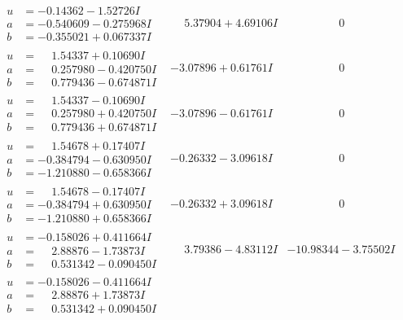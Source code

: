\documentclass[1p]{elsarticle_modified}
\theoremstyle{definition}
\begin{document}
$$\begin{array}{c|c|c}
\begin{aligned}
u &= -0.14362 - 1.52726 I \\
a &= -0.540609 - 0.275968 I \\
b &= -0.355021 + 0.067337 I\end{aligned}
 & \phantom{-}5.37904 + 4.69106 I & \phantom{-0.000000 } 0 \\ \hline\begin{aligned}
u &= \phantom{-}1.54337 + 0.10690 I \\
a &= \phantom{-}0.257980 - 0.420750 I \\
b &= \phantom{-}0.779436 - 0.674871 I\end{aligned}
 & -3.07896 + 0.61761 I & \phantom{-0.000000 } 0 \\ \hline\begin{aligned}
u &= \phantom{-}1.54337 - 0.10690 I \\
a &= \phantom{-}0.257980 + 0.420750 I \\
b &= \phantom{-}0.779436 + 0.674871 I\end{aligned}
 & -3.07896 - 0.61761 I & \phantom{-0.000000 } 0 \\ \hline\begin{aligned}
u &= \phantom{-}1.54678 + 0.17407 I \\
a &= -0.384794 - 0.630950 I \\
b &= -1.210880 - 0.658366 I\end{aligned}
 & -0.26332 - 3.09618 I & \phantom{-0.000000 } 0 \\ \hline\begin{aligned}
u &= \phantom{-}1.54678 - 0.17407 I \\
a &= -0.384794 + 0.630950 I \\
b &= -1.210880 + 0.658366 I\end{aligned}
 & -0.26332 + 3.09618 I & \phantom{-0.000000 } 0 \\ \hline\begin{aligned}
u &= -0.158026 + 0.411664 I \\
a &= \phantom{-}2.88876 - 1.73873 I \\
b &= \phantom{-}0.531342 - 0.090450 I\end{aligned}
 & \phantom{-}3.79386 - 4.83112 I & -10.98344 - 3.75502 I \\ \hline\begin{aligned}
u &= -0.158026 - 0.411664 I \\
a &= \phantom{-}2.88876 + 1.73873 I \\
b &= \phantom{-}0.531342 + 0.090450 I\end{aligned}

\end{array}$$
\end{document}
